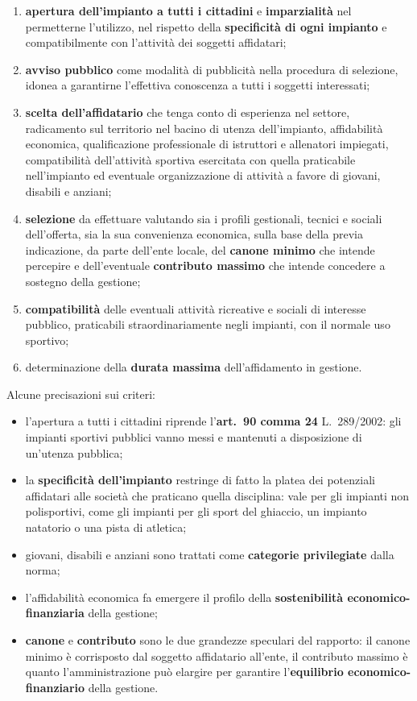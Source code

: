 \begin{enumerate}
  \item[a)] \textbf{apertura dell'impianto a tutti i cittadini} e \textbf{imparzialità} nel
    permetterne l'utilizzo, nel rispetto della \textbf{specificità di ogni impianto} e
    compatibilmente con l'attività dei soggetti affidatari;
  \item[b)] \textbf{avviso pubblico} come modalità di pubblicità nella procedura di selezione,
    idonea a garantirne l'effettiva conoscenza a tutti i soggetti interessati;
  \item[c)] \textbf{scelta dell'affidatario} che tenga conto di esperienza nel settore,
    radicamento sul territorio nel bacino di utenza dell'impianto, affidabilità economica,
    qualificazione professionale di istruttori e allenatori impiegati, compatibilità dell'attività
    sportiva esercitata con quella praticabile nell'impianto ed eventuale organizzazione di
    attività a favore di giovani, disabili e anziani;
  \item[d)] \textbf{selezione} da effettuare valutando sia i profili gestionali, tecnici e sociali
    dell'offerta, sia la sua convenienza economica, sulla base della previa indicazione, da parte
    dell'ente locale, del \textbf{canone minimo} che intende percepire e dell'eventuale
    \textbf{contributo massimo} che intende concedere a sostegno della gestione;
  \item[e)] \textbf{compatibilità} delle eventuali attività ricreative e sociali di interesse
    pubblico, praticabili straordinariamente negli impianti, con il normale uso sportivo;
  \item[f)] determinazione della \textbf{durata massima} dell'affidamento in gestione.
\end{enumerate}

Alcune precisazioni sui criteri:

\begin{itemize}
  \item l'apertura a tutti i cittadini riprende l'\textbf{art.\ 90 comma 24} L.\ 289/2002: gli
    impianti sportivi pubblici vanno messi e mantenuti a disposizione di un'utenza pubblica;
  \item la \textbf{specificità dell'impianto} restringe di fatto la platea dei potenziali
    affidatari alle società che praticano quella disciplina: vale per gli impianti non
    polisportivi, come gli impianti per gli sport del ghiaccio, un impianto natatorio o una pista
    di atletica;
  \item giovani, disabili e anziani sono trattati come \textbf{categorie privilegiate} dalla norma;
  \item l'affidabilità economica fa emergere il profilo della \textbf{sostenibilità economico-%
    finanziaria} della gestione;
  \item \textbf{canone} e \textbf{contributo} sono le due grandezze speculari del rapporto: il
    canone minimo è corrisposto dal soggetto affidatario all'ente, il contributo massimo è quanto
    l'amministrazione può elargire per garantire l'\textbf{equilibrio economico-finanziario} della
    gestione.
\end{itemize}

